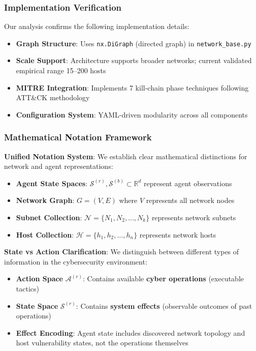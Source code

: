 \documentclass[12pt,twoside]{article}
\newcounter{phase}[algorithm]
\theoremstyle{definition}
\theoremstyle{plain}
\begin{document}
\subsubsection{Implementation Verification}
Our analysis confirms the following implementation details:
\begin{itemize}
    \item \textbf{Graph Structure}: Uses \texttt{nx.DiGraph} (directed graph) in \texttt{network\_base.py}
    \item \textbf{Scale Support}: Architecture supports broader networks; current validated empirical range 15--200 hosts
    \item \textbf{MITRE Integration}: Implements 7 kill-chain phase techniques following ATT\&CK methodology
    \item \textbf{Configuration System}: YAML-driven modularity across all components
\end{itemize}

\subsubsection{Mathematical Notation Framework}

\textbf{Unified Notation System}: We establish clear mathematical distinctions for network and agent representations:

\begin{itemize}
\item \textbf{Agent State Spaces}: $\mathcal{S}^{(r)}, \mathcal{S}^{(b)} \subset \mathbb{R}^{d}$ represent agent observations
\item \textbf{Network Graph}: $G = (V, E)$ where $V$ represents all network nodes  
\item \textbf{Subnet Collection}: $\mathcal{N} = \{N_1, N_2, \ldots, N_k\}$ represents network subnets
\item \textbf{Host Collection}: $\mathcal{H} = \{h_1, h_2, \ldots, h_n\}$ represents network hosts
\end{itemize}

\textbf{State vs Action Clarification}: We distinguish between different types of information in the cybersecurity environment:
\begin{itemize}
\item \textbf{Action Space} $\mathcal{A}^{(r)}$: Contains available \textbf{cyber operations} (executable tactics)
\item \textbf{State Space} $\mathcal{S}^{(r)}$: Contains \textbf{system effects} (observable outcomes of past operations)  
\item \textbf{Effect Encoding}: Agent state includes discovered network topology and host vulnerability states, not the operations themselves
\end{itemize}
\end{document}
